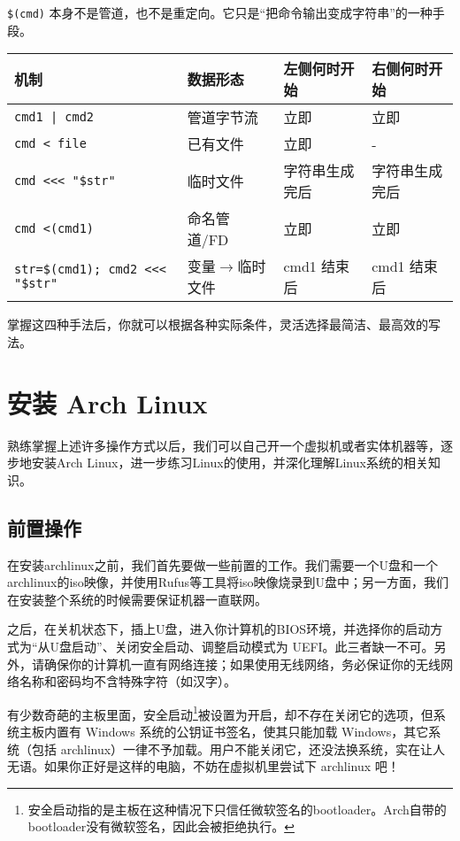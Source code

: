 \documentclass[../main.tex]{subfiles}
\begin{document}
\texttt{\$(cmd)} 本身不是管道，也不是重定向。它只是“把命令输出变成字符串”的一种手段。

\begin{table}[ht]\small
  \centering
  \begin{tabular}{llll}
    \toprule
    机制 & 数据形态 & 左侧何时开始 & 右侧何时开始 \\
    \midrule
    \texttt{cmd1 | cmd2} & 管道字节流 & 立即 & 立即 \\
    \texttt{cmd < file} & 已有文件 & 立即 & - \\
    \texttt{cmd <<< "\$str"} & 临时文件 & 字符串生成完后 & 字符串生成完后 \\
    \texttt{cmd <(cmd1)} & 命名管道/FD & 立即 & 立即 \\
    \texttt{str=\$(cmd1); cmd2 <<< "\$str"} & 变量$\rightarrow$临时文件 & cmd1 结束后 & cmd1 结束后 \\
    \bottomrule
  \end{tabular}
\end{table}

掌握这四种手法后，你就可以根据各种实际条件，灵活选择最简洁、最高效的写法。

\section{安装 Arch Linux}

熟练掌握上述许多操作方式以后，我们可以自己开一个虚拟机或者实体机器等，逐步地安装Arch Linux，进一步练习Linux的使用，并深化理解Linux系统的相关知识。

\subsection{前置操作}

在安装archlinux之前，我们首先要做一些前置的工作。我们需要一个U盘和一个archlinux的iso映像，并使用Rufus等工具将iso映像烧录到U盘中；另一方面，我们在安装整个系统的时候需要保证机器一直联网。

之后，在关机状态下，插上U盘，进入你计算机的BIOS环境，并选择你的启动方式为“从U盘启动”、关闭安全启动、调整启动模式为 UEFI。此三者缺一不可。另外，请确保你的计算机一直有网络连接；如果使用无线网络，务必保证你的无线网络名称和密码均不含特殊字符（如汉字）。

\begin{note}
  有少数奇葩的主板里面，安全启动\footnote{安全启动指的是主板在这种情况下只信任微软签名的bootloader。Arch自带的bootloader没有微软签名，因此会被拒绝执行。}被设置为开启，却不存在关闭它的选项，但系统主板内置有 Windows 系统的公钥证书签名，使其只能加载 Windows，其它系统（包括 archlinux）一律不予加载。用户不能关闭它，还没法换系统，实在让人无语。如果你正好是这样的电脑，不妨在虚拟机里尝试下 archlinux 吧！
\end{note}
\end{document}
